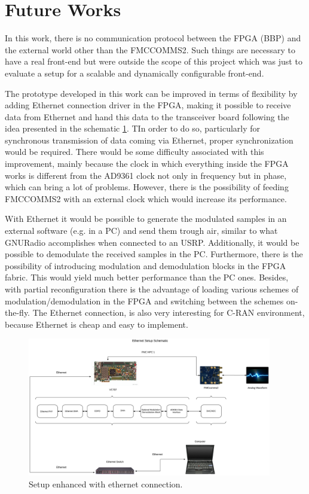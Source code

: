 \section{Future Works}
\label{sec:futurew}

In this work, there is no communication protocol between the FPGA (BBP) and the
external world other than the FMCCOMMS2. Such things are necessary to have a real
front-end but were outside the scope of this project which was just to evaluate a
setup for a scalable and dynamically configurable front-end.

The prototype developed in this work can be improved in terms of flexibility by
adding Ethernet connection driver in the FPGA, making it possible to receive
data from Ethernet and hand this data to the transceiver board following the
idea presented in the schematic \ref{fig:setupeth}. TIn order to do so,
particularly for synchronous transmission of data coming via Ethernet, proper
synchronization would be required. There would be some difficulty associated
with this improvement, mainly because the clock in which everything inside the
FPGA works is different from the AD9361 clock not only in frequency but in
phase, which can bring a lot of problems. However, there is the possibility of
feeding FMCCOMMS2 with an external clock which would increase its performance.

With Ethernet it would be possible to generate the modulated samples in an
external software (e.g. in a PC) and send them trough air, similar to what
GNURadio accomplishes when connected to an USRP. Additionally, it would be
possible to demodulate the received samples in the PC. Furthermore, there is the
possibility of introducing modulation and demodulation blocks in the FPGA
fabric. This would yield much better performance than the PC ones. Besides, with
partial reconfiguration there is the advantage of loading various schemes of
modulation/demodulation in the FPGA and switching between the schemes
on-the-fly. The Ethernet connection, is also very interesting for C-RAN
environment, because Ethernet is cheap and easy to implement.

\begin{figure}[htbp]
    \centering
    \includegraphics[width=0.95\textwidth]{./figures/eth_setup}
    \caption{ Setup enhanced with ethernet connection.
    \label{fig:setupeth}}
\end{figure}

